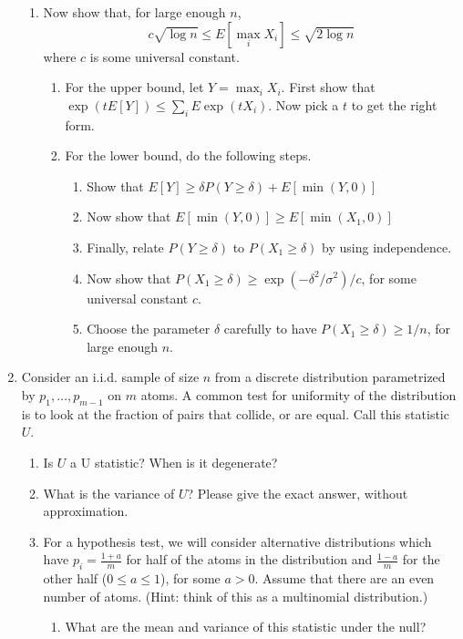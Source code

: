 \documentclass[11pt]{article}
\begin{document}
\begin{enumerate}
\begin{enumerate}
	\item Now show that, for large enough $n$, 
	$$c\sqrt{\log n} \leq E[\max_i X_i]\leq \sqrt{2\log n}$$
where $c$ is some universal constant. 
\begin{enumerate}
	\item For the upper bound, let $Y=\max_i X_i$. First show that $\exp(tE[Y])\leq \sum_i E\exp (tX_i)$. Now pick a $t$ to get the right form.
	\item For the lower bound,  do the following steps.
	\begin{enumerate}
		\item Show that $E[Y]\geq \delta P(Y\geq \delta)+E[\min(Y,0)]$
		\item Now show that $E[\min(Y,0)]\geq E[\min(X_1,0)]$
		\item Finally, relate $P(Y\geq \delta)$ to $P(X_1\geq \delta)$ by using independence.
		\item  Now show that $P(X_1\geq \delta)\geq \exp(-\delta^2/\sigma^2)/c$, for some universal constant $c$.
		\item Choose the parameter $\delta$ carefully to have $P(X_1\geq \delta)\geq 1/n$, for large enough $n$. 
	\end{enumerate}
\end{enumerate}
\end{enumerate}
\iffalse
\item Consider an i.i.d. sample of size $n$ from a discrete distribution parametrized by $p_1,\dots, p_{m-1}$  on $m$ atoms. A common test for uniformity of the distribution is to look at the fraction of pairs that collide, or are equal. Call this statistic $U$.
\begin{enumerate}
	\item Is $U$ a U statistic? When is it degenerate?
		\item What is the variance of $U$? Please give the exact answer, without approximation. 
	\item For a hypothesis test, we will consider alternative distributions which have $p_i=\frac{1+a}{m}$ for half of the atoms in the distribution and $\frac{1-a}{m}$ for the other half ($0\le a\le 1$), for some $a>0$. Assume that there are an even number of atoms. (Hint: think of this as a multinomial distribution.)%
	\begin{enumerate}
		\item What are the mean and variance of this statistic under the null?

\end{enumerate}
\end{enumerate}
\end{enumerate}
\end{document}
